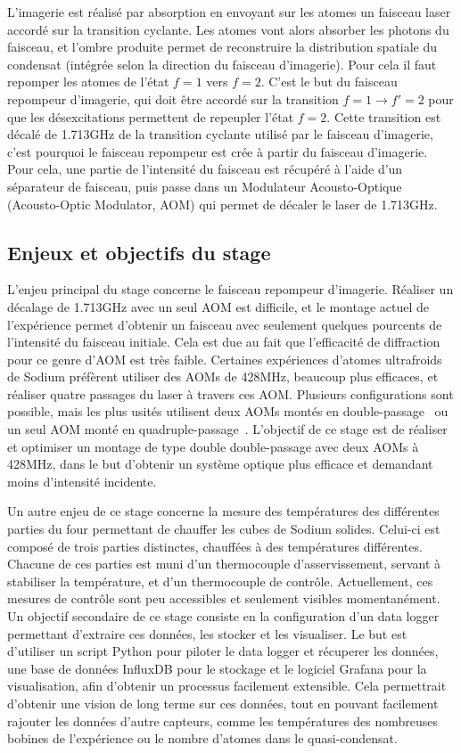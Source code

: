 \documentclass[12pt, a4paper]{article}
\begin{document}
L'imagerie est réalisé par absorption en envoyant sur les atomes un faisceau laser accordé sur la transition cyclante. Les atomes vont alors absorber les photons du faisceau, et l'ombre produite permet de reconstruire la distribution spatiale du condensat (intégrée selon la direction du faisceau d'imagerie). Pour cela il faut repomper les atomes de l'état \(f=1\) vers \(f=2\). C'est le but du faisceau repompeur d'imagerie, qui doit être accordé sur la transition \(f=1 \rightarrow f'=2\) pour que les désexcitations permettent de repeupler l'état \(f=2\). Cette transition est décalé de 1.713GHz de la transition cyclante utilisé par le faisceau d'imagerie, c'est pourquoi le faisceau repompeur est crée à partir du faisceau d'imagerie. Pour cela, une partie de l'intensité du faisceau est récupéré à l'aide d'un séparateur de faisceau, puis passe dans un Modulateur Acousto-Optique (Acousto-Optic Modulator, AOM) qui permet de décaler le laser de 1.713GHz.

\subsection{Enjeux et objectifs du stage}

L'enjeu principal du stage concerne le faisceau repompeur d'imagerie. Réaliser un décalage de 1.713GHz avec un seul AOM est difficile, et le montage actuel de l'expérience permet d'obtenir un faisceau avec seulement quelques pourcents de l'intensité du faisceau initiale. Cela est due au fait que l'efficacité de diffraction pour ce genre d'AOM est très faible. Certaines expériences d'atomes ultrafroids de Sodium préfèrent utiliser des AOMs de 428MHz, beaucoup plus efficaces, et réaliser quatre passages du laser à travers ces AOM. Plusieurs configurations sont possible, mais les plus usités utilisent deux AOMs montés en double-passage~\cite{BEC_sodium_double-pass} ou un seul AOM monté en quadruple-passage~\cite{lu_four-pass_2017}. L'objectif de ce stage est de réaliser et optimiser un montage de type double double-passage avec deux AOMs à 428MHz, dans le but d'obtenir un système optique plus efficace et demandant moins d'intensité incidente.

Un autre enjeu de ce stage concerne la mesure des températures des différentes parties du four permettant de chauffer les cubes de Sodium solides. Celui-ci est composé de trois parties distinctes, chauffées à des températures différentes. Chacune de ces parties est muni d'un thermocouple d'asservissement, servant à stabiliser la température, et d'un thermocouple de contrôle. Actuellement, ces mesures de contrôle sont peu accessibles et seulement visibles momentanément. Un objectif secondaire de ce stage consiste en la configuration d'un data logger permettant d'extraire ces données, les stocker et les visualiser. Le but est d'utiliser un script Python pour piloter le data logger et récuperer les données, une base de données InfluxDB pour le stockage et le logiciel Grafana pour la visualisation, afin d'obtenir un processus facilement extensible. Cela permettrait 
d'obtenir une vision de long terme sur ces données, tout en pouvant facilement rajouter les données d'autre capteurs, comme les températures des nombreuses bobines de l'expérience ou le nombre d'atomes dans le quasi-condensat. 
\end{document}
